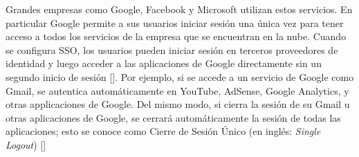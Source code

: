 Grandes empresas como Google, Facebook y Microsoft utilizan estos servicios. En particular Google permite a sus usuarios iniciar sesión una única vez para tener acceso a todos los servicios de la empresa que se encuentran en la nube. Cuando se configura SSO, los usuarios pueden iniciar sesión en terceros proveedores de identidad y luego acceder a las aplicaciones de Google directamente sin un segundo inicio de sesión [\cite{google-support}]. Por ejemplo, si se accede a un servicio de Google como Gmail, se autentica automáticamente en YouTube, AdSense, Google Analytics, y otras applicaciones de Google. Del mismo modo, si cierra la sesión de su Gmail u otras aplicaciones de Google, se cerrará automáticamente la sesión de todas las aplicaciones; esto se conoce como Cierre de Sesión Único (en inglés: \textit{Single Logout}) [\cite{sso-doc}]

%
%
%
%

